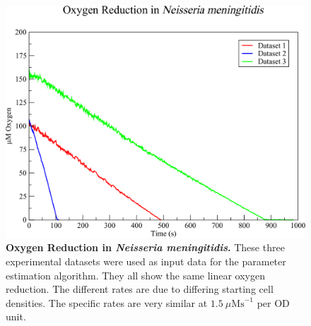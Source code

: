 \begin{figure}[p]
 \centering
 \includegraphics[width=14cm]{./05-oxygenreduction/data/o2_datasets.pdf}
 \caption[{Oxygen Reduction in \textit{Neisseria meningitidis}.}]{{\bf Oxygen Reduction in \textit{Neisseria meningitidis}.} These three experimental datasets were used as input data for the parameter estimation algorithm. They all show the same linear oxygen reduction. The different rates are due to differing starting cell densities. The specific rates are very similar at $1.5~\mu\mathrm{Ms}^{-1}$ per OD unit.
 \label{fig:o2data}}
\end{figure}
\afterpage{\clearpage}

